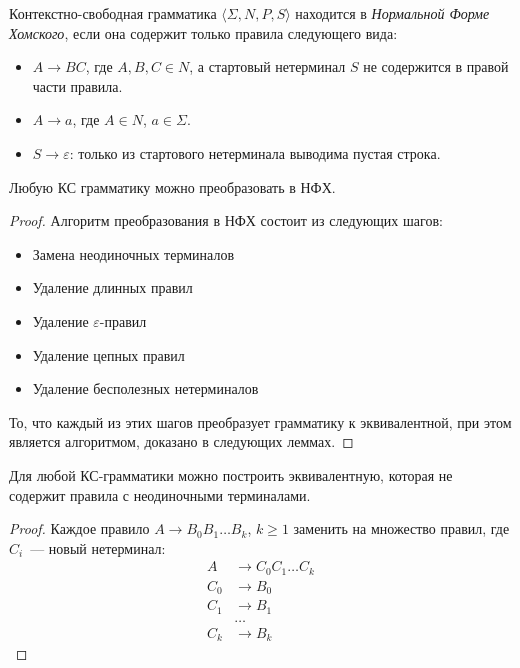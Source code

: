 \begin{definition}
    Контекстно-свободная грамматика $\langle \Sigma, N, P, S\rangle$ находится в \emph{Нормальной Форме Хомского}, если она содержит только правила следующего вида:
    \begin{itemize}
        \item $A \to B C$, где $A, B, C \in N$, а стартовый нетерминал $S$ не содержится в правой части правила.
        \item $A \to a$, где $A \in N$, $a \in \Sigma$.
        \item $S \to \varepsilon$: только из стартового нетерминала выводима пустая строка.
    \end{itemize}
\end{definition}

\begin{theorem}
    Любую КС грамматику можно преобразовать в НФХ.
\end{theorem}

\begin{proof}
    Алгоритм преобразования в НФХ состоит из следующих шагов:
    \begin{itemize}
        \item Замена неодиночных терминалов
        \item Удаление длинных правил
        \item Удаление $\varepsilon$-правил
        \item Удаление цепных правил
        \item Удаление бесполезных нетерминалов
    \end{itemize}
    То, что каждый из этих шагов преобразует грамматику к эквивалентной, при этом является алгоритмом, доказано в следующих леммах.
\end{proof}

\begin{lemma}
    Для любой КС-грамматики можно построить эквивалентную, которая не содержит правила с неодиночными терминалами.
\end{lemma}

\begin{proof}
    Каждое правило $A \to B_0 B_1 \dots B_k$, $k \geq 1$ заменить на множество правил, где $C_i$~--- новый нетерминал:
    \begin{align*}
        A   & \to C_0 C_1 \dots C_k \\
        C_0 & \to B_0               \\
        C_1 & \to B_1               \\
            & \dots                 \\
        C_k & \to B_k
    \end{align*}
\end{proof}

